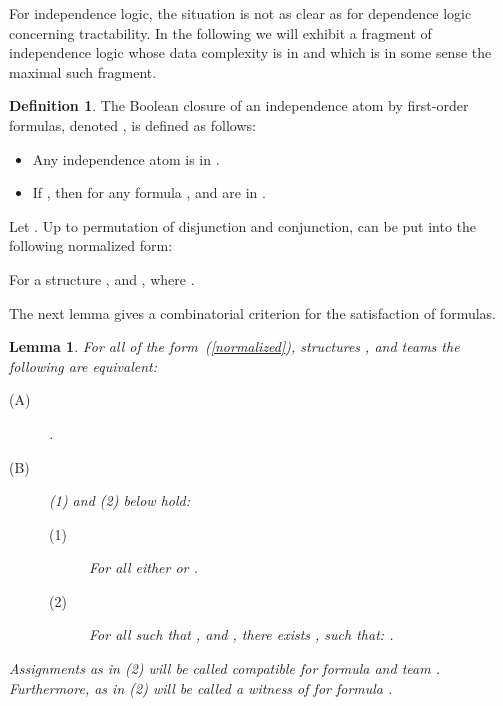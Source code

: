 \documentclass{article}
\theoremstyle{plain}
\newtheorem{lemma}[theorem]{Lemma}
\theoremstyle{definition}
\newtheorem{definition}[theorem]{Definition}
\newcommand{\fo}{{\rm FO}}
\begin{document}
For independence logic, the situation is not as clear as for dependence logic concerning tractability.
 In the following we will exhibit a fragment of independence logic whose data complexity is in  and which is in some sense the maximal such fragment. 
 















\newcommand{\bcindepfo}{\mathsf{BC}(\bot,\fo)}
\newcommand{\CCm}{\mathfrak{C}^{-}}
\newcommand{\CCp}{\mathfrak{C}^{+}}

\begin{definition} The Boolean closure of an independence atom by first-order formulas, 
denoted , is defined as follows:

\begin{itemize} 
\item Any independence atom  is in .

\item If , then for any formula ,  and  are  in . 
\end{itemize}
\end{definition}

Let . Up to permutation of disjunction and conjunction,  can be put into the following normalized form:



For a structure ,  and , where 
 . 


The next lemma gives a combinatorial criterion for the satisfaction of  formulas. 

\begin{lemma}\label{bcindepfo}
For all  of the form~(\ref{normalized}), structures ,  and teams   the following are equivalent:
\begin{description}
\item [(A)].
\item [(B)] (1) and (2) below hold: 
\begin{description}

\item[(1)] For all  either  or . 

\item[(2)]\label{c2}  For all  such that , and ,   there exists ,
such that: . 




\end{description}

\end{description}Assignments   as in (2) will be called \textit{compatible} for formula  and team . Furthermore,  as in (2) will be called a \textit{witness} of  for formula .
\end{lemma}
\end{document}
